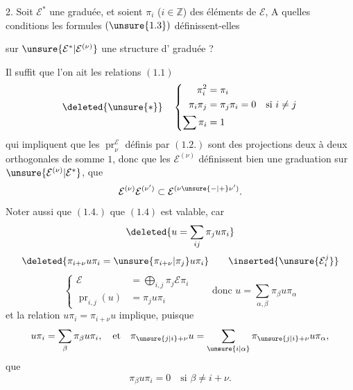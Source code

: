 2. Soit $\mathcal E^*$ une  graduée, et soient $\pi_i$ ($i\in\mathbb Z$) des éléments de $\mathcal E$,  A quelles conditions les formules $(\unsure{1.3})$ définissent-elles

sur $\unsure{\mathcal E^*|\mathcal E^{(\nu)}}$ une structure d' graduée ?

Il suffit que l'on ait les relations $(1.1)$
\[
\deleted{\unsure{*}}\quad\left\{\begin{aligned}
\pi_i^2&=\pi_i\\
\pi_i\pi_j&=\pi_j\pi_i=0\quad\text{si }i\neq j\\
\sum\pi_i&=1
\end{aligned}\right.
\]
qui impliquent que les $\operatorname{pr}_{\nu}^{\mathcal E}$ définis par $(1.2.)$ sont des projections deux à deux orthogonales de somme $1$, donc que les $\mathcal E^{(\nu)}$ définissent bien une graduation  sur $\unsure{\mathcal E^{(\nu)}|\mathcal E^*}$,  que
\[
\mathcal E^{(\nu)}\mathcal E^{(\nu')}\subset\mathcal E^{(\nu\unsure{-|+}\nu')}.
\]
Noter aussi que $(1.4.)$ que $(1.4)$ est valable, car 
\[
\deleted{u=\sum_{ij}\pi_j u\pi_i}
\]
\[
\deleted{\pi_{i+\nu}u\pi_i=\unsure{\pi_{i+\nu}|\pi_j}u\pi_i}
\qquad\inserted{\unsure{\mathcal E_i^j}}
\]
\[
\left\{\begin{aligned}
\mathcal E&=\bigoplus_{i,j}\pi_j\mathcal E\pi_i\\
\operatorname{pr}_{i,j}(u)&=\pi_j u\pi_i
\end{aligned}\right.
\qquad\text{donc }u=\sum_{\alpha,\beta}\pi_\beta u\pi_\alpha
\]
et la relation $u\pi_i=\pi_{i+\nu}u$ implique, puisque
\[
u\pi_i=\sum_\beta\pi_\beta u\pi_i,\quad\text{et}\quad
\pi_{\unsure{j|i}+\nu}u=\sum_{\unsure{i|\alpha}}\pi_{\unsure{j|i}+\nu}u\pi_\alpha,
\]
que
\[
\pi_\beta u\pi_i=0\quad\text{si }\beta\neq i+\nu.
\]


